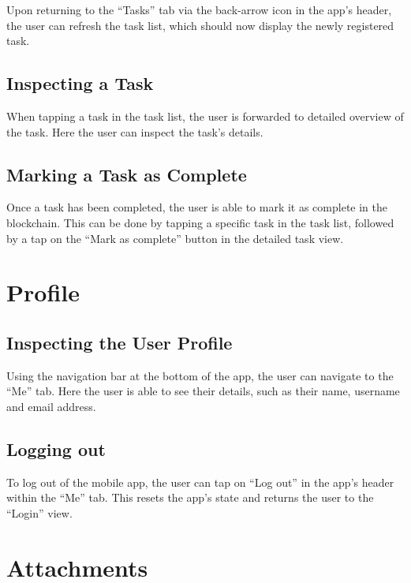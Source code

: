 Upon returning to the ``Tasks'' tab via the back-arrow icon in the app's
header, the user can refresh the task list, which should now display the
newly registered task.

\subsection{Inspecting a Task}\label{inspecting-a-task}

When tapping a task in the task list, the user is forwarded to detailed
overview of the task. Here the user can inspect the task's details.

\subsection{Marking a Task as
Complete}\label{marking-a-task-as-complete}

Once a task has been completed, the user is able to mark it as complete
in the blockchain. This can be done by tapping a specific task in the
task list, followed by a tap on the ``Mark as complete'' button in the
detailed task view.

\section{Profile}\label{profile}

\subsection{Inspecting the User
Profile}\label{inspecting-the-user-profile}

Using the navigation bar at the bottom of the app, the user can navigate
to the ``Me'' tab. Here the user is able to see their details, such as
their name, username and email address.

\subsection{Logging out}\label{logging-out}

To log out of the mobile app, the user can tap on ``Log out'' in the
app's header within the ``Me'' tab. This resets the app's state and
returns the user to the ``Login'' view.

\section{Attachments}\label{attachments}


